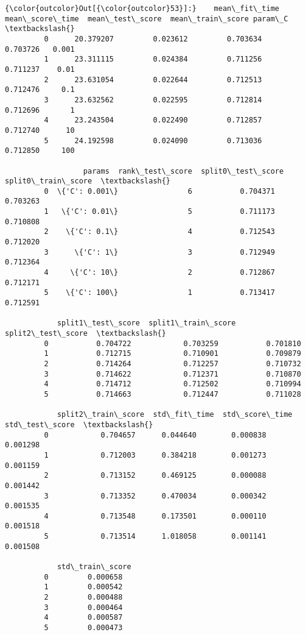 \documentclass[11pt]{article}
\begin{document}
            \begin{Verbatim}[commandchars=\\\{\}]
{\color{outcolor}Out[{\color{outcolor}53}]:}    mean\_fit\_time  mean\_score\_time  mean\_test\_score  mean\_train\_score param\_C  \textbackslash{}
         0      20.379207         0.023612         0.703634          0.703726   0.001   
         1      23.311115         0.024384         0.711256          0.711237    0.01   
         2      23.631054         0.022644         0.712513          0.712476     0.1   
         3      23.632562         0.022595         0.712814          0.712696       1   
         4      23.243504         0.022490         0.712857          0.712740      10   
         5      24.192598         0.024090         0.713036          0.712850     100   
         
                  params  rank\_test\_score  split0\_test\_score  split0\_train\_score  \textbackslash{}
         0  \{'C': 0.001\}                6           0.704371            0.703263   
         1   \{'C': 0.01\}                5           0.711173            0.710808   
         2    \{'C': 0.1\}                4           0.712543            0.712020   
         3      \{'C': 1\}                3           0.712949            0.712364   
         4     \{'C': 10\}                2           0.712867            0.712171   
         5    \{'C': 100\}                1           0.713417            0.712591   
         
            split1\_test\_score  split1\_train\_score  split2\_test\_score  \textbackslash{}
         0           0.704722            0.703259           0.701810   
         1           0.712715            0.710901           0.709879   
         2           0.714264            0.712257           0.710732   
         3           0.714622            0.712371           0.710870   
         4           0.714712            0.712502           0.710994   
         5           0.714663            0.712447           0.711028   
         
            split2\_train\_score  std\_fit\_time  std\_score\_time  std\_test\_score  \textbackslash{}
         0            0.704657      0.044640        0.000838        0.001298   
         1            0.712003      0.384218        0.001273        0.001159   
         2            0.713152      0.469125        0.000088        0.001442   
         3            0.713352      0.470034        0.000342        0.001535   
         4            0.713548      0.173501        0.000110        0.001518   
         5            0.713514      1.018058        0.001141        0.001508   
         
            std\_train\_score  
         0         0.000658  
         1         0.000542  
         2         0.000488  
         3         0.000464  
         4         0.000587  
         5         0.000473  
\end{Verbatim}
        
\end{document}
